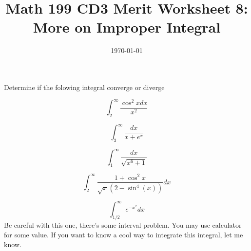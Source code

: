 
\usepackage{fullpage,amsmath,amssymb,amsthm}

\newcommand{\D}{\displaystyle}

\title{Math 199 CD3 Merit Worksheet 8: More on Improper Integral}
\date{\today}




\maketitle
Determine if the folowing integral converge or diverge
\be
	\item $$\int_2^\infty\frac{\cos^2x dx}{x^2}$$
	\vfill
	\item $$\int_3^\infty\frac{dx}{x+e^x}$$
	\vfill
	\item $$\int_1^\infty\frac{dx}{\sqrt{x^6+1}}$$\vfill
	\newpage
	\item $$\int_2^\infty\frac{	1+\cos^2x}{\sqrt x(2-\sin^4(x))}dx$$
	\vfill
	
	\item $$\int_{1/2}^\infty e^{-x^2}dx$$
	Be careful with this one, there's some interval problem. You may use calculator for some value. If you want to know a cool way to integrate this integral, let me know.
	\vfill


\ee

